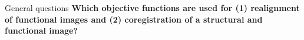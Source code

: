 \documentclass{beamer}
\begin{document}
\begin{frame}{General questions}
  \textbf{Which objective functions are used for (1) realignment of functional images and (2) coregistration of a structural and functional image? }

%
%
%
\end{frame}

%
%
%
%
\end{document}
